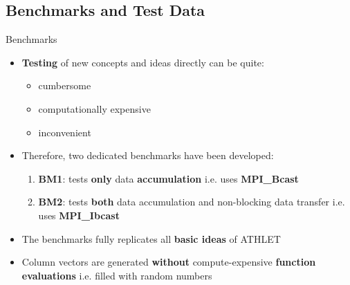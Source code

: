 \subsection{Benchmarks and Test Data}

\ifPresentation
\begin{frame}[t]{Benchmarks}

    \justifying
    
    \begin{itemize}
        \setlength\itemsep{0.5cm}
        
        \item \textbf{Testing} of new concepts and ideas directly  can be quite:
        \begin{itemize}
            \item cumbersome
            \item computationally expensive
            \item inconvenient
        \end{itemize}
        
        \item Therefore, two dedicated benchmarks have been developed:
            \begin{enumerate}
                \item \textbf{BM1}: tests \textbf{only} data \textbf{accumulation} i.e. uses \textbf{MPI\_Bcast}
                
                \item \textbf{BM2}: tests \textbf{both} data accumulation and non-blocking data transfer i.e. uses \textbf{MPI\_Ibcast}
            \end{enumerate}
            
        \item The benchmarks fully replicates all \textbf{basic ideas} of ATHLET
        
        \item Column vectors are generated \textbf{without} compute-expensive \textbf{function evaluations} i.e. filled with random numbers
    \end{itemize}

\end{frame}


